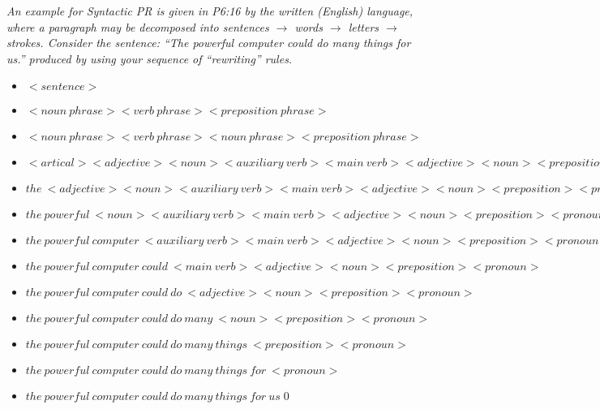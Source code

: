 \documentclass[
        ]{beamer}
\begin{document}
    		\begin{frame}[t]{\subsecname}
    			\begin{overprint}
    				\emph{An example for Syntactic PR is given in P6:16 by the written (English) language, where a paragraph may be decomposed into sentences $\rightarrow$ words $\rightarrow$ letters $\rightarrow$ strokes. Consider the sentence: ``The powerful computer could do many things for us.'' produced by using your sequence of ``rewriting'' rules. }
    				\onslide<2>  %
    				\onslide<3> 
    					\begin{itemize}
    						\item
    						$<sentence>$
    						\item $<noun\ phrase><verb\ phrase><preposition\ phrase>$
    						\item $<noun\ phrase><verb\ phrase><noun\ phrase><preposition\ phrase>$
    						\item $<artical><adjective><noun><auxiliary\ verb><main\ verb><adjective><noun><preposition><pronoun>$
    						\item $the\ <adjective><noun><auxiliary\ verb><main\ verb><adjective><noun><preposition><pronoun>$
    						\item $the\ powerful\ <noun><auxiliary\ verb><main\ verb><adjective><noun><preposition><pronoun>$
							\end{itemize}
    					\begin{itemize}
    						\item $the\ powerful\ computer\ <auxiliary\ verb><main\ verb><adjective><noun><preposition><pronoun>$
    						\item $the\ powerful\ computer\ could\ <main\ verb><adjective><noun><preposition><pronoun>$
    						\item $the\ powerful\ computer\ could\ do\ <adjective><noun><preposition><pronoun>$
    						\item $the\ powerful\ computer\ could\ do\ many\ <noun><preposition><pronoun>$
    						\item $the\ powerful\ computer\ could\ do\ many\ things\ <preposition><pronoun>$
    						\item $the\ powerful\ computer\ could\ do\ many\ things\ for\ <pronoun>$
    						\item $the\ powerful\ computer\ could\ do\ many\ things\ for\ us$\qed	
							\end{itemize}								
    			\end{overprint}
    		\end{frame}
\end{document}
